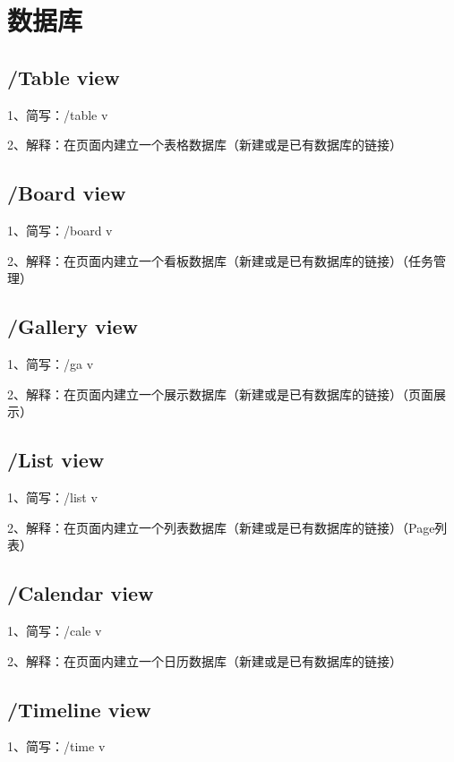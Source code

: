 \chapter{数据库}

\section{/Table view}

1、简写：/table v

2、解释：在页面内建立一个表格数据库（新建或是已有数据库的链接）

\section{/Board view}

1、简写：/board v

2、解释：在页面内建立一个看板数据库（新建或是已有数据库的链接）（任务管理）

\section{/Gallery view}

1、简写：/ga v

2、解释：在页面内建立一个展示数据库（新建或是已有数据库的链接）（页面展示）

\section{/List view}

1、简写：/list v

2、解释：在页面内建立一个列表数据库（新建或是已有数据库的链接）（Page列表）

\section{/Calendar view}

1、简写：/cale v

2、解释：在页面内建立一个日历数据库（新建或是已有数据库的链接）

\section{/Timeline view}

1、简写：/time v

